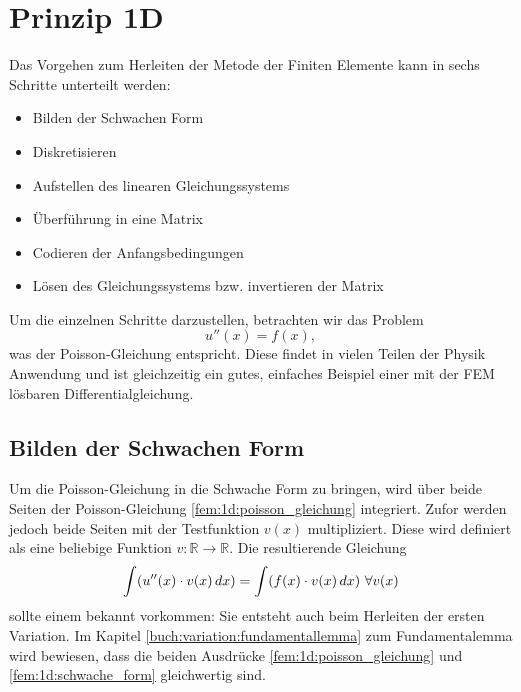 %
%
%
%
\section{Prinzip 1D\label{fem:prinzip_1d}}

Das Vorgehen zum Herleiten der Metode der Finiten Elemente kann in sechs Schritte unterteilt werden:
\begin{itemize}
    \item Bilden der Schwachen Form
    \item Diskretisieren
    \item Aufstellen des linearen Gleichungssystems
    \item Überführung in eine Matrix
    \item Codieren der Anfangsbedingungen
    \item Lösen des Gleichungssystems bzw. invertieren der Matrix
\end{itemize}

Um die einzelnen Schritte darzustellen, betrachten wir das Problem
\begin{equation}
    u''(x) = f(x)
    \label{fem:1d:poisson_gleichung},
\end{equation}
was der Poisson-Gleichung entspricht. 
Diese findet in vielen Teilen der Physik Anwendung und ist gleichzeitig ein gutes, einfaches Beispiel einer mit der FEM lösbaren Differentialgleichung.


\subsection{Bilden der Schwachen Form\label{fem:1d:schwache_form}}
Um die Poisson-Gleichung in die Schwache Form zu bringen, wird über beide Seiten der Poisson-Gleichung \ref{fem:1d:poisson_gleichung} integriert.
Zufor werden jedoch beide Seiten mit der Testfunktion $ v(x) $ multipliziert. %
Diese wird definiert als eine beliebige Funktion $ v: \mathbb{R} \rightarrow \mathbb{R} $.
Die resultierende Gleichung
\begin{equation}
    \int(u''(x) \cdot v(x) \, d x) = \int(f(x) \cdot v(x) \, d x) \ \forall v(x)
    \label{fem:1d:schwache_form_equation}
\end{equation}
sollte einem bekannt vorkommen: Sie entsteht auch beim Herleiten der ersten Variation.
Im Kapitel \ref{buch:variation:fundamentallemma} zum Fundamentalemma wird bewiesen, dass die beiden Ausdrücke \ref{fem:1d:poisson_gleichung} und \ref{fem:1d:schwache_form} gleichwertig sind.

